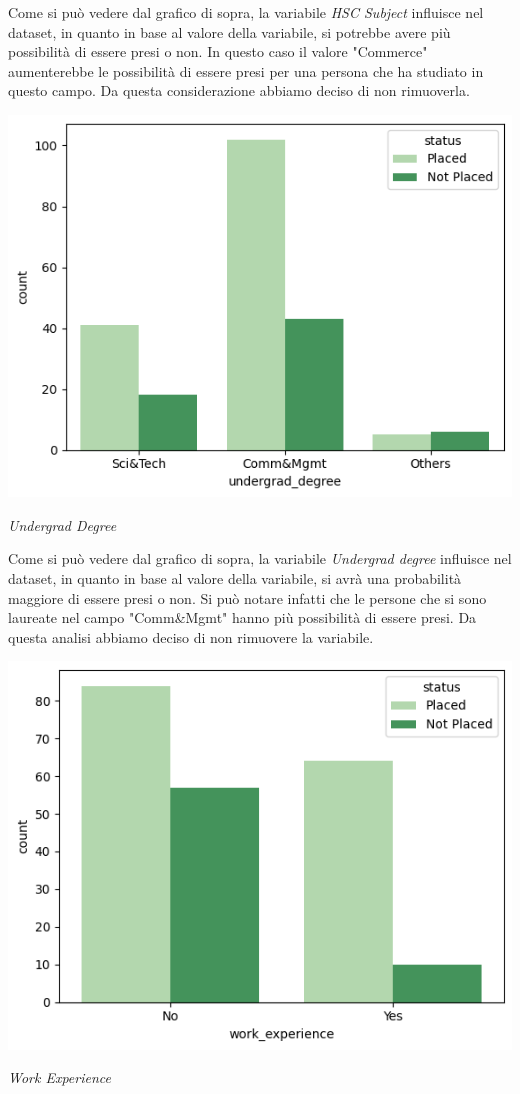 \documentclass[12pt]{article}
\begin{document}
Come si può vedere dal grafico di sopra, la variabile \textit{HSC Subject} influisce nel dataset, in quanto in base al valore della variabile, si potrebbe avere più possibilità di essere presi o non. In questo caso il valore "Commerce" aumenterebbe le possibilità di essere presi per una persona che ha studiato in questo campo.
Da questa considerazione abbiamo deciso di non rimuoverla.
\begin{center}
    \includegraphics[scale=0.5]{undergraddegree.png}

    \textit{Undergrad Degree}
\end{center}
Come si può vedere dal grafico di sopra, la variabile \textit{Undergrad degree} influisce nel dataset, in quanto in base al valore della variabile, si avrà una probabilità maggiore di essere presi o non. Si può notare infatti che le persone che si sono laureate nel campo "Comm\&Mgmt" hanno più possibilità di essere presi.
Da questa analisi abbiamo deciso di non rimuovere la variabile.
\begin{center}
    \includegraphics[scale=0.5]{workexperience.png}

    \textit{Work Experience}
\end{center}
\end{document}
